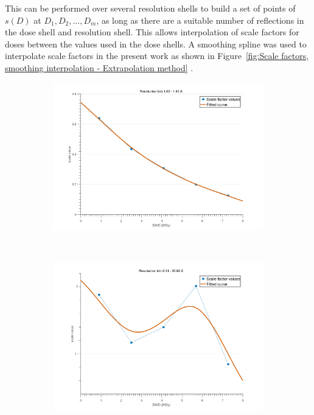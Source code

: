 This can be performed over several resolution shells to build a set of points of $s(D)$ at $D_1, D_2,\ldots, D_m$, as long as there are a suitable number of reflections in the dose shell and resolution shell.
This allows interpolation of scale factors for doses between the values used in the dose shells.
A smoothing spline was used to interpolate scale factors in the present work as shown in Figure~\ref{fig:Scale factors, smoothing interpolation - Extrapolation method} .
\begin{figure}
        \centering
        \begin{subfigure}[b]{0.9\textwidth}
                \centering
                \includegraphics[width=\textwidth]{figures/zde/scale_fit_bin12.pdf}
                \caption{}
                \label{fig:monotonic scale factor - Extrapolation method}
        \end{subfigure}
				\\
        \begin{subfigure}[b]{0.9\textwidth}
                \centering
                \includegraphics[width=\textwidth]{figures/zde/scale_fit_bin1.pdf}

\end{subfigure}
\end{figure}

